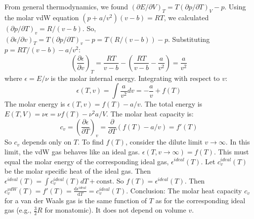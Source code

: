 \documentclass[11pt]{article}
\newcommand{\pderiv}[2]{\frac{\partial #1}{\partial #2}}
\newcommand{\deriv}[2]{\frac{\mathrm{d} #1}{\mathrm{d} #2}}
\begin{document}
From general thermodynamics, we found $(\partial E/\partial V)_T = T(\partial p/\partial T)_V - p$.
Using the molar vdW equation $(p+a/v^2)(v-b)=RT$, we calculated $(\partial p/\partial T)_v = R/(v-b)$.
So, $(\partial \epsilon/\partial v)_T = T(\partial p/\partial T)_v - p = T(R/(v-b)) - p$.
Substituting $p = RT/(v-b) - a/v^2$:
\[ \left( \pderiv{\epsilon}{v} \right)_T = \frac{RT}{v-b} - \left( \frac{RT}{v-b} - \frac{a}{v^2} \right) = \frac{a}{v^2} \]
where $\epsilon = E/\nu$ is the molar internal energy.
Integrating with respect to $v$:
\[ \epsilon(T,v) = \int \frac{a}{v^2} dv = -\frac{a}{v} + f(T) \]
The molar energy is $\epsilon(T,v) = f(T) - a/v$. The total energy is $E(T,V) = \nu \epsilon = \nu f(T) - \nu^2 a / V$.
The molar heat capacity is:
\[ c_v = \left( \pderiv{\epsilon}{T} \right)_v = \pderiv{}{T} (f(T) - a/v) = f'(T) \]
So $c_v$ depends only on $T$.
To find $f(T)$, consider the dilute limit $v \to \infty$. In this limit, the vdW gas behaves like an ideal gas.
$\epsilon(T, v \to \infty) = f(T)$. This must equal the molar energy of the corresponding ideal gas, $\epsilon^{ideal}(T)$.
Let $c_v^{ideal}(T)$ be the molar specific heat of the ideal gas. Then $\epsilon^{ideal}(T) = \int c_v^{ideal}(T) dT + \text{const}$.
So $f(T) = \epsilon^{ideal}(T)$.
Then $c_v^{vdW}(T) = f'(T) = \deriv{\epsilon^{ideal}}{T} = c_v^{ideal}(T)$.
Conclusion: The molar heat capacity $c_v$ for a van der Waals gas is the same function of $T$ as for the corresponding ideal gas (e.g., $\frac{3}{2}R$ for monatomic). It does not depend on volume $v$.
\end{document}
